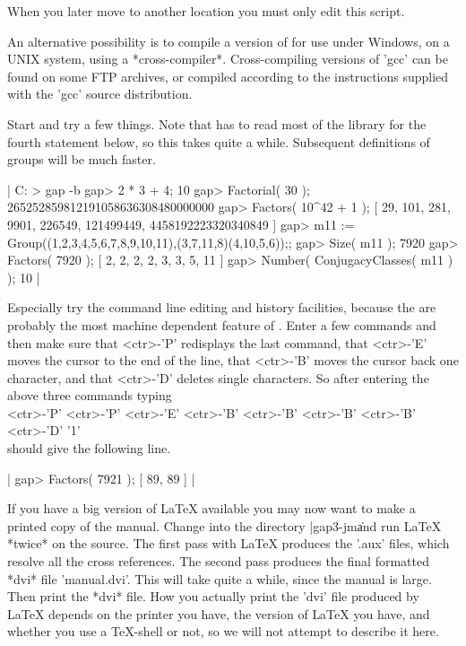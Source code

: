 When you later move {\GAP} to another  location  you must only  edit this
script.

An alternative possibility  is  to compile a   version of {\GAP} for  use
under Windows, on a UNIX system, using a *cross-compiler*. Cross-compiling
versions  of   'gcc' can be  found  on  some FTP    archives, or compiled
according to    the  instructions   supplied   with  the  'gcc'    source
distribution.

Start {\GAP} and try a few things.  Note that {\GAP} has  to read most of
the library for the fourth statement below,  so this takes quite a while.
Subsequent definitions of groups will be much faster.

|    C: > gap -b
    gap> 2 * 3 + 4;
    10
    gap> Factorial( 30 );
    265252859812191058636308480000000
    gap> Factors( 10^42 + 1 );
    [ 29, 101, 281, 9901, 226549, 121499449, 4458192223320340849 ]
    gap> m11 := Group((1,2,3,4,5,6,7,8,9,10,11),(3,7,11,8)(4,10,5,6));;
    gap> Size( m11 );
    7920
    gap> Factors( 7920 );
    [ 2, 2, 2, 2, 3, 3, 5, 11 ]
    gap> Number( ConjugacyClasses( m11 ) );
    10 |

Especially try the command  line editing  and history facilities, because
the are probably the most  machine dependent feature  of {\GAP}.  Enter a
few commands   and then make  sure  that  <ctr>-'P' redisplays   the last
command, that  <ctr>-'E'  moves the cursor  to the end  of the line, that
<ctr>-'B' moves the cursor back one character, and that <ctr>-'D' deletes
single characters.  So after entering the above three commands typing\\
<ctr>-'P' <ctr>-'P' <ctr>-'E' <ctr>-'B'
<ctr>-'B' <ctr>-'B' <ctr>-'B' <ctr>-'D' '1'\\
should give the following line.

|    gap> Factors( 7921 );
    [ 89, 89 ] |

If you have a big version of {\LaTeX} available  you may now want to make
a printed copy of the  manual.  Change into the directory |gap3-jm\doc\|
and  run {\LaTeX} *twice* on the   source.  The first  pass with {\LaTeX}
produces the '.aux'  files, which resolve  all the cross references.  The
second pass produces  the final formatted  *dvi* file 'manual.dvi'.  This
will take quite a while, since the manual is large.  Then print the *dvi*
file.  How you actually print the 'dvi' file produced by {\LaTeX} depends
on the printer you  have, the version of {\LaTeX}  you have,  and whether
you use a  {\TeX}-shell  or not, so we   will not attempt to describe  it
here.

